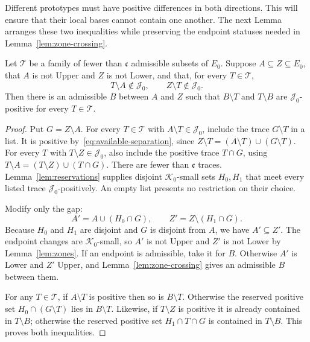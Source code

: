 Different prototypes must have positive differences in both directions.
This will ensure that their local bases cannot contain one another.
The next Lemma arranges these two inequalities while preserving the
endpoint statuses needed in Lemma~\ref{lem:zone-crossing}.

\begin{lemma}\label{lem:insert-prototype}
Let $\mathcal T$ be a family of fewer than $\mathfrak c$ admissible subsets
of $E_0$.
Suppose $A\subseteq Z\subseteq E_0$, that $A$ is not Upper and $Z$ is
not Lower, and that, for every $T\in\mathcal T$,
\begin{equation}\label{eq:available-separation}
 T\setminus A\notin\mathcal J_0,
 \qquad Z\setminus T\notin\mathcal J_0.
\end{equation}
Then there is an admissible $B$ between $A$ and $Z$ such that
$B\setminus T$ and $T\setminus B$ are $\mathcal J_0$-positive for every
$T\in\mathcal T$.
\end{lemma}

\begin{proof}
Put $G=Z\setminus A$.
For every $T\in\mathcal T$ with $A\setminus T\in\mathcal J_0$,
include the trace $G\setminus T$ in a list.
It is positive by~\eqref{eq:available-separation}, since
$Z\setminus T=(A\setminus T)\cup(G\setminus T)$.
For every $T$ with $T\setminus Z\in\mathcal J_0$, also include the
positive trace $T\cap G$, using
$T\setminus A=(T\setminus Z)\cup(T\cap G)$.
There are fewer than $\mathfrak c$ traces.
Lemma~\ref{lem:reservations} supplies disjoint $\mathcal K_0$-small sets
$H_0,H_1$ that meet every listed trace $\mathcal J_0$-positively.
An empty list presents no restriction on their choice.

Modify only the gap:
\begin{equation}\label{eq:gap-reservations}
 A'=A\cup(H_0\cap G),\qquad
 Z'=Z\setminus(H_1\cap G).
\end{equation}
Because $H_0$ and $H_1$ are disjoint and $G$ is disjoint from $A$, we have
$A'\subseteq Z'$.
The endpoint changes are $\mathcal K_0$-small, so $A'$ is not Upper and
$Z'$ is not Lower by Lemma~\ref{lem:zones}.
If an endpoint is admissible, take it for $B$.
Otherwise $A'$ is Lower and $Z'$ Upper, and
Lemma~\ref{lem:zone-crossing} gives an admissible $B$ between them.

For any $T\in\mathcal T$, if $A\setminus T$ is positive then so is
$B\setminus T$.
Otherwise the reserved positive set $H_0\cap(G\setminus T)$ lies in
$B\setminus T$.
Likewise, if $T\setminus Z$ is positive it is already contained in
$T\setminus B$; otherwise the reserved positive set $H_1\cap T\cap G$
is contained in $T\setminus B$.
This proves both inequalities.
\end{proof}

